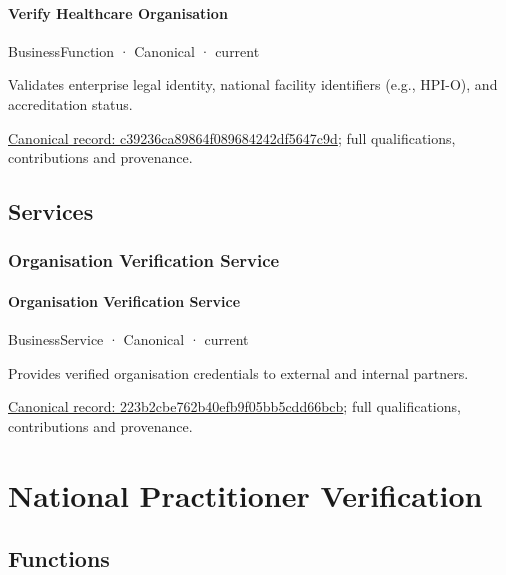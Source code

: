 \paragraph{Verify Healthcare Organisation}

\label{element:c39236ca89864f089684242df5647c9d}
{\small BusinessFunction · Canonical · current}\par

Validates enterprise legal identity, national facility identifiers (e.g., HPI-O), and accreditation status.


{\footnotesize \href{../../../../continuum/business/business-function/c39236ca89864f089684242df5647c9d.md}{Canonical record: c39236ca89864f089684242df5647c9d}; full qualifications, contributions and provenance.}\par
\subsection{Services}

\subsubsection{Organisation Verification Service}

\paragraph{Organisation Verification Service}

\label{element:223b2cbe762b40efb9f05bb5cdd66bcb}
{\small BusinessService · Canonical · current}\par

Provides verified organisation credentials to external and internal partners.


{\footnotesize \href{../../../../continuum/business/business-service/223b2cbe762b40efb9f05bb5cdd66bcb.md}{Canonical record: 223b2cbe762b40efb9f05bb5cdd66bcb}; full qualifications, contributions and provenance.}\par
\section{National Practitioner Verification}

\subsection{Functions}

